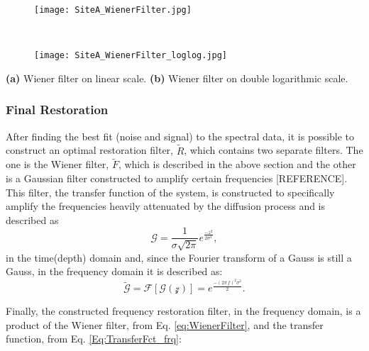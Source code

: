 \documentclass[../../CompleteThesis2/Complete_2ndDraft]{subfiles}
\begin{document}
\begin{marginfigure}
	\centering
	\begin{subfigure}{\marginparwidth}
		\centering
		\texttt{[image: SiteA\_WienerFilter.jpg]}
		\caption{\footnotesize}
		\label{fig:SiteA_WienerFilter}
	\end{subfigure}\\[1ex]
	
	\begin{subfigure}{\marginparwidth}
		\centering
		\texttt{[image: SiteA\_WienerFilter\_loglog.jpg]}
		\caption{\footnotesize}
		\label{fig:SiteA_WienerFilter_loglog}
	\end{subfigure}
	\caption[Wiener filter]{\footnotesize\textbf{(a)} Wiener filter on linear scale. \textbf{(b)} Wiener filter on double logarithmic scale.}
	\label{fig:SiteA_WienerFilters}
\end{marginfigure}

\subsubsection[Final Restoration][Final Restoration]{Final Restoration}
\label{Subsubsec:SignalAnalysis_BackDiffusion_FinalRestoration}

After finding the best fit (noise and signal) to the spectral data, it is possible to construct an optimal restoration filter, $\tilde{R}$, which contains two separate filters. The one is the Wiener filter, $\tilde{F}$, which is described in the above section and the other is a Gaussian filter constructed to amplify certain frequencies [REFERENCE]. This filter, the transfer function of the system, is constructed to specifically amplify the frequencies heavily attenuated by the diffusion process and is described as
\begin{equation}
	\mathcal{G} = \frac{1}{\sigma\sqrt{2\pi}} e^{\frac{-z^2}{2\sigma^2}},
	\label{Eq:TransferFct_z}
\end{equation}
in the time(depth) domain and, since the Fourier transform of a Gauss is still a Gauss, in the frequency domain it is described as:
\begin{equation}
	\tilde{\mathcal{G}} = \mathcal{F}[\mathcal{G(z)}] = e^{\frac{-(2\pi\, f)^2\sigma^2}{2}}.
	\label{Eq:TransferFct_frq}
\end{equation}

Finally, the constructed frequency restoration filter, in the frequency domain, is a product of the Wiener filter, from Eq. \ref{eq:WienerFilter}, and the transfer function, from Eq. \ref{Eq:TransferFct_frq}:
\end{document}
